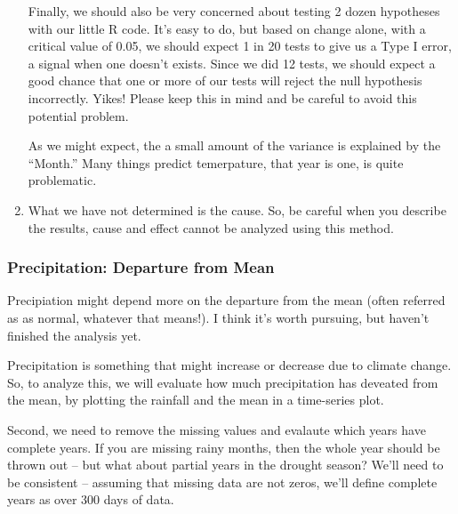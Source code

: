 \documentclass{article}\usepackage[]{graphicx}\usepackage[]{color}
\begin{document}
\begin{enumerate}
Finally, we should also be very concerned about testing 2 dozen hypotheses with our little R code. It's easy to do, but based on change alone, with a critical value of 0.05, we should expect 1 in 20 tests to give us a Type I error, a signal when one doesn't exists. Since we did 12 tests, we should expect a good chance that one or more of our tests will reject the null hypothesis incorrectly. Yikes!  
Please keep this in mind and be careful to avoid this potential problem. 

As we might expect, the a small amount of the variance is explained by the ``Month.'' Many things predict temerpature, that year is one, is quite problematic.

\item What we have not determined is the cause. So, be careful when you describe the results, cause and effect cannot be analyzed using this method.

\end{enumerate}

\subsubsection{Precipitation: Departure from Mean}

Precipiation might depend more on the departure from the mean (often referred as as normal, whatever that means!).  I think it's worth pursuing, but haven't finished the analysis yet.

Precipitation is something that might increase or decrease due to climate change. So, to analyze this, we will evaluate how much precipitation has deveated from the mean, by plotting the rainfall and the mean in a time-series plot. 

Second, we need to remove the missing values and evalaute which years have complete years. If you are missing rainy months, then the whole year should be thrown out -- but what about partial years in the drought season? We'll need to be consistent -- assuming that missing data are not zeros, we'll define complete years as over 300 days of data. 
\end{document}
